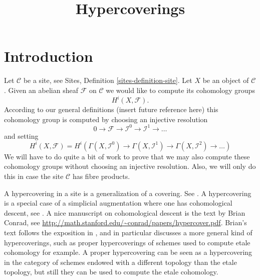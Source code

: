 

%


\title{Hypercoverings}


\maketitle

\label{section-phantom}

\tableofcontents

\section{Introduction}
\label{section-introduction}

\noindent
Let $\mathcal{C}$ be a site, see Sites, Definition \ref{sites-definition-site}.
Let $X$ be an object of $\mathcal{C}$.
Given an abelian sheaf $\mathcal{F}$
on $\mathcal{C}$ we would like to compute
its cohomology groups
$$
H^i(X, \mathcal{F}).
$$
According to our general definitions
(insert future reference here)
this cohomology group is computed by
choosing an injective resolution
$$
0 \to \mathcal{F} \to \mathcal{I}^0 \to \mathcal{I}^1 \to \ldots
$$
and setting
$$
H^i(X, \mathcal{F})
=
H^i(
\Gamma(X, \mathcal{I}^0) \to
\Gamma(X, \mathcal{I}^1) \to
\Gamma(X, \mathcal{I}^2)\to \ldots)
$$
We will have to do quite a bit of work to prove that we
may also compute these cohomology groups without
choosing an injective resolution. Also, we will only do this
in case the site $\mathcal{C}$ has fibre products.

\medskip\noindent
A hypercovering in a site is a generalization of a covering.
See \cite[Expose V, Sec. 7]{SGA4}. A hypercovering is a special
case of a simplicial augmentation where one has cohomological
descent, see \cite[Expose Vbis]{SGA4}. A nice manuscript on
cohomological descent is the text by Brian Conrad, see
\url{http://math.stanford.edu/~conrad/papers/hypercover.pdf}.
Brian's text follows the exposition in \cite[Expose Vbis]{SGA4}, and in
particular discusses a more general kind of hypercoverings, such as
proper hypercoverings of schemes used to compute etale cohomology
for example. A proper hypercovering can be seen as a hypercovering
in the category of schemes endowed with a different topology than
the etale topology, but still they can be used to compute the etale
cohomology.





























